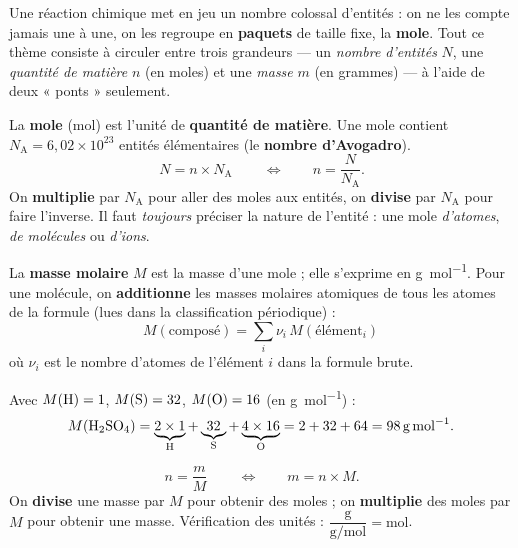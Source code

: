 \documentclass[11pt,a4paper]{article}
\begin{document}
\noindent
Une réaction chimique met en jeu un nombre colossal d'entités : on ne les compte jamais une à une,
on les regroupe en \textbf{paquets} de taille fixe, la \textbf{mole}. Tout ce thème consiste à
circuler entre trois grandeurs — un \emph{nombre d'entités} $N$, une \emph{quantité de matière} $n$
(en moles) et une \emph{masse} $m$ (en grammes) — à l'aide de deux « ponts » seulement.

\begin{cle}
La \textbf{mole} (\si{\mole}) est l'unité de \textbf{quantité de matière}. Une mole contient
$N_{\mathrm{A}} = 6{,}02\times10^{23}$ entités élémentaires (le \textbf{nombre d'Avogadro}).
\[ \boxed{\,N = n\times N_{\mathrm{A}}\,}\qquad\Longleftrightarrow\qquad n = \dfrac{N}{N_{\mathrm{A}}}. \]
On \textbf{multiplie} par $N_{\mathrm{A}}$ pour aller des moles aux entités, on \textbf{divise} par $N_{\mathrm{A}}$ pour
faire l'inverse. Il faut \emph{toujours} préciser la nature de l'entité : une mole \emph{d'atomes},
\emph{de molécules} ou \emph{d'ions}.
\end{cle}

\begin{methode}
La \textbf{masse molaire} $M$ est la masse d'une mole ; elle s'exprime en \si{\gram\per\mole}.
Pour une molécule, on \textbf{additionne} les masses molaires atomiques de tous les atomes de la
formule (lues dans la classification périodique) :
\[ \boxed{\,M(\text{composé}) = \sum_i \nu_i\, M(\text{élément}_i)\,} \]
où $\nu_i$ est le nombre d'atomes de l'élément $i$ dans la formule brute.
\end{methode}

\begin{exemplebox}
Avec $M(\ce{H})=1$, $M(\ce{S})=32$, $M(\ce{O})=16$ (en \si{\gram\per\mole}) :
\[ M(\ce{H2SO4}) = \underbrace{2\times 1}_{\ce{H}} + \underbrace{32}_{\ce{S}} + \underbrace{4\times 16}_{\ce{O}}
   = 2+32+64 = \SI{98}{\gram\per\mole}. \]
\end{exemplebox}

\begin{cle}
\[ \boxed{\,n = \dfrac{m}{M}\,}\qquad\Longleftrightarrow\qquad m = n\times M. \]
On \textbf{divise} une masse par $M$ pour obtenir des moles ; on \textbf{multiplie} des moles par
$M$ pour obtenir une masse. Vérification des unités : $\dfrac{\si{\gram}}{\si{\gram\per\mole}}=\si{\mole}$.
\end{cle}
\end{document}
